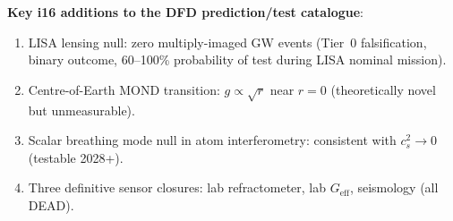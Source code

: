 \documentclass[11pt]{article}
\theoremstyle{definition}
\theoremstyle{remark}
\newcommand{\Geff}{G_{\mathrm{eff}}}
\begin{document}
\textbf{Key i16 additions to the DFD prediction/test catalogue}:
\begin{enumerate}[nosep]
\item LISA lensing null: zero multiply-imaged GW events
  (Tier~0 falsification, binary outcome, 60--100\% probability
  of test during LISA nominal mission).
\item Centre-of-Earth MOND transition: $g \propto \sqrt{r}$
  near $r = 0$ (theoretically novel but unmeasurable).
\item Scalar breathing mode null in atom interferometry:
  consistent with $c_s^2 \to 0$ (testable 2028+).
\item Three definitive sensor closures: lab refractometer,
  lab $\Geff$, seismology (all DEAD).
\end{enumerate}
\end{document}
